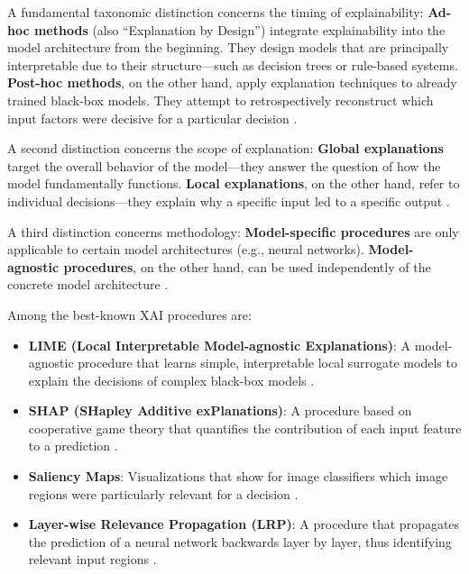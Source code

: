 \documentclass[
  12pt,
  a4paper,
  oneside,
  titlepage
]{article}
\begin{document}
A fundamental taxonomic distinction concerns the timing of explainability: 
\textbf{Ad-hoc methods} (also \enquote{Explanation by Design}) integrate explainability 
into the model architecture from the beginning. They design models that are 
principally interpretable due to their structure—such as decision trees or rule-based 
systems. \textbf{Post-hoc methods}, on the other hand, apply explanation techniques 
to already trained black-box models. They attempt to retrospectively reconstruct 
which input factors were decisive for a particular decision 
\citep[ p.~92]{BarredoArrieta2020}.

A second distinction concerns the scope of explanation: \textbf{Global explanations} 
target the overall behavior of the model—they answer the question of how the model 
fundamentally functions. \textbf{Local explanations}, on the other hand, refer to 
individual decisions—they explain why a specific input led to a specific output 
\citep[ p.~80805]{Ortigossa2024}.

A third distinction concerns methodology: \textbf{Model-specific procedures} are only 
applicable to certain model architectures (e.g., neural networks). \textbf{Model-agnostic 
procedures}, on the other hand, can be used independently of the concrete model 
architecture \citep[ p.~3]{Mersha2024}.

Among the best-known XAI procedures are:

\begin{itemize}
    \item \textbf{LIME (Local Interpretable Model-agnostic Explanations)}: A 
    model-agnostic procedure that learns simple, interpretable local surrogate models 
    to explain the decisions of complex black-box models 
    \citep[ p.~102]{BarredoArrieta2020}.
    
    \item \textbf{SHAP (SHapley Additive exPlanations)}: A procedure based on 
    cooperative game theory that quantifies the contribution of each input feature 
    to a prediction \citep[ p.~104]{BarredoArrieta2020}.
    
    \item \textbf{Saliency Maps}: Visualizations that show for image classifiers 
    which image regions were particularly relevant for a decision \citep{Zhou2019}.
    
    \item \textbf{Layer-wise Relevance Propagation (LRP)}: A procedure that 
    propagates the prediction of a neural network backwards layer by layer, thus 
    identifying relevant input regions \citep{Montavon2019}.
\end{itemize}
\end{document}
